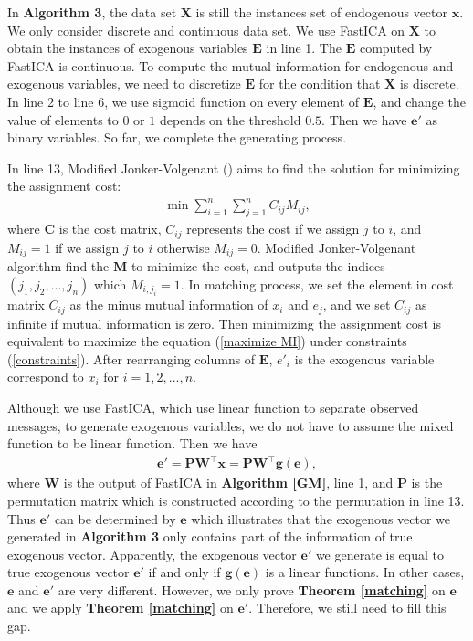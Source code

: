\documentclass[twoside,11pt]{article}
\begin{document}
In \textbf{Algorithm 3}, the data set $\mathbf X$ is still the instances set of endogenous vector $\mathbf x$. We only consider discrete and continuous data set. We use FastICA on $\mathbf X$ to obtain the instances of exogenous variables $\mathbf E$ in line 1. The $\mathbf E$ computed by FastICA is continuous. To compute the mutual information for endogenous and exogenous variables, we need to discretize $\mathbf E$ for the condition that $\mathbf X$ is discrete. In line 2 to line 6, we use sigmoid function on every element of $\mathbf E$, and change the value of elements to $0$ or $1$ depends on the threshold $0.5$. Then we have $\mathbf e'$ as binary variables. So far, we complete the generating process. 

In line 13, Modified Jonker-Volgenant (\cite{crouse2016implementing}) aims to find the solution for minimizing the assignment cost:
\begin{align*}
    \min\sum^n_{i=1}\sum^n_{j=1} C_{ij}M_{ij},
\end{align*}
where $\mathbf C$ is the cost matrix, $C_{ij}$ represents the cost if we assign $j$ to $i$, and $M_{ij}=1$ if we assign $j$ to $i$ otherwise $M_{ij}=0$. Modified Jonker-Volgenant algorithm find the $\mathbf M$ to minimize the cost, and outputs the indices $(j_1, j_2, ..., j_n)$ which $M_{i,j_i}=1$. In matching process, we set the element in cost matrix $C_{ij}$ as the minus mutual information of $x_i$ and $e_j$, and we set $C_{ij}$ as infinite if mutual information is zero. Then minimizing the assignment cost is equivalent to maximize the equation (\ref{maximize MI}) under constraints (\ref{constraints}). After rearranging columns of $\mathbf E$, $e'_i$ is the exogenous variable correspond to $x_i$ for $i=1, 2, ..., n$. 

Although we use FastICA, which use linear function to separate observed messages, to generate exogenous variables, we do not have to assume the mixed function to be linear function. Then we have 
\begin{align*}
\mathbf e'=\mathbf P\mathbf W^\top\mathbf x=\mathbf P\mathbf W^\top\mathbf g(\mathbf e),
\end{align*}
where $\mathbf W$ is the output of FastICA in \textbf{Algorithm \ref{GM}}, line 1, and $\mathbf P$ is the permutation matrix which is constructed according to the permutation in line 13. Thus $\mathbf e'$ can be determined by $\mathbf e$ which illustrates that the exogenous vector we generated in \textbf{Algorithm 3} only contains part of the information of true exogenous vector. Apparently, the exogenous vector $\mathbf e'$ we generate is equal to true exogenous vector $\mathbf e'$ if and only if $\mathbf g(\mathbf e)$ is a linear functions. In other cases, $\mathbf e$ and $\mathbf e'$ are very different. However, we only prove \textbf{Theorem \ref{matching}} on $\mathbf e$ and we apply \textbf{Theorem \ref{matching}} on $\mathbf e'$. Therefore, we still need to fill this gap.
\end{document}
